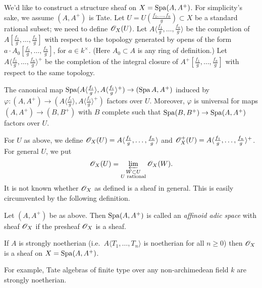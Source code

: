 We'd like to construct a structure sheaf on $X=\operatorname{Spa}(A,A^+)$. For simplicity's 
sake, we assume $(A,A^+)$ is Tate. Let 
$U=U\left(\frac{f_1,\dots,f_n}{g}\right)\subset X$ be a standard rational 
subset; we need to define $\mathscr{O}_X(U)$. Let 
$A\langle \frac{f_1}{g},\dots,\frac{f_n}{g}\rangle$ be the completion of 
$A[\frac{f_1}{g},\dots,\frac{f_n}{g}]$ with respect to the topology generated 
by opens of the form $a\cdot A_0[\frac{f_1}{g},\dots,\frac{f_n}{g}]$, for 
$a\in k^\times$. (Here $A_0\subset A$ is any ring of definition.) 
Let $A\langle \frac{f_1}{g},\dots,\frac{f_n}{g}\rangle^+$ be the completion of 
the integral closure of $A^+[\frac{f_1}{g},\dots,\frac{f_n}{g}]$ with respect 
to the same topology. 

\begin{proposition}
The canonical map $\operatorname{Spa}(A\langle\frac{f_i}{g}\rangle,A\langle \frac{f_i}{g}\rangle^+) \to (\operatorname{Spa} A,A^+)$ induced by $\varphi:(A,A^+) \to (A\langle \frac{f_i}{g}\rangle, A\langle \frac{f_i}{g}\rangle^+)$ factors over $U$. Moreover, $\varphi$ is universal for maps 
$(A,A^+) \to (B,B^+)$ with $B$ complete such that $\operatorname{Spa}(B,B^+) \to \operatorname{Spa}(A,A^+)$ factors over $U$. 
\end{proposition}

For $U$ as above, we define 
$\mathscr{O}_X(U)=A\langle \frac{f_1}{g},\dots,\frac{f_n}{g}\rangle$ and 
$\mathscr{O}_X^+(U) = A\langle \frac{f_1}{g},\dots,\frac{f_n}{g}\rangle^+$. For general 
$U$, we put 
\[
  \mathscr{O}_X(U) = \varprojlim_{\substack{W\subset U \\ U\text{ rational}}} \mathscr{O}_X(W) .
\]
It is not known whether $\mathscr{O}_X$ as defined is a sheaf in general. This is 
easily circumvented by the following definition. 

\begin{definition}
Let $(A,A^+)$ be as above. Then $\operatorname{Spa}(A,A^+)$ is called an \emph{affinoid adic 
space} with sheaf $\mathscr{O}_X$ if the presheaf $\mathscr{O}_X$ is a sheaf. 
\end{definition}

\begin{theorem}
If $A$ is strongly noetherian (i.e.\ $A\langle T_1,\dots,T_n\rangle$ is 
noetherian for all $n\geqslant 0$) then $\mathscr{O}_X$ is a sheaf on $X=\operatorname{Spa}(A,A^+)$. 
\end{theorem}

For example, Tate algebras of finite type over any non-archimedean field $k$ 
are strongly noetherian. 

